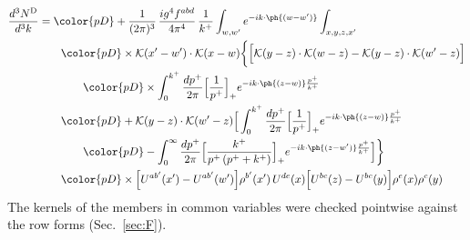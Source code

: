 \begin{align}
\frac{d^{3}N^{\rm D}}{d^{3}k}&={\color{pD}+\frac{1}{(2\pi)^{3}}\,\frac{ig^{4}f^{abd}}{4\pi^{4}}\,\frac{1}{k^{+}}\int_{w,w'}e^{-ik\cdot\ph{(w-w')}}\int_{x,y,z,x'}}\notag\\
&\qquad{\color{pD}\times\mathcal{K}(x'-w')\cdot\mathcal{K}(x-w)\bigg\{\Big[\mathcal{K}(y-z)\cdot\mathcal{K}(w-z)-\mathcal{K}(y-z)\cdot\mathcal{K}(w'-z)\Big]}\notag\\
&\qquad\qquad{\color{pD}\times\int_{0}^{k^{+}}\frac{dp^{+}}{2\pi}\Big[\frac{1}{p^{+}}\Big]_{+}e^{-ik\cdot\ph{(z-w)}\frac{p^{+}}{k^{+}}}}\notag\\
&\qquad{\color{pD}+\mathcal{K}(y-z)\cdot\mathcal{K}(w'-z)\Big[\int_{0}^{k^{+}}\frac{dp^{+}}{2\pi}\Big[\frac{1}{p^{+}}\Big]_{+}e^{-ik\cdot\ph{(z-w)}\frac{p^{+}}{k^{+}}}}\notag\\
&\qquad\qquad{\color{pD}-\int_{0}^{\infty}\frac{dp^{+}}{2\pi}\Big[\frac{k^{+}}{p^{+}\,(p^{+}+k^{+})}\Big]_{+}e^{-ik\cdot\ph{(z-w')}\frac{p^{+}}{k^{+}}}\Big]\bigg\}}\notag\\
&\qquad{\color{pD}\times\Big[U^{ab'}(x')-U^{ab'}(w')\Big]\rho^{b'}(x')\,U^{de}(x)\Big[U^{bc}(z)-U^{bc}(y)\Big]\rho^{e}(x)\rho^{c}(y)}\label{eq:C-D}
\end{align}
The kernels of the members in common variables were checked pointwise against the row forms (Sec.~\ref{sec:F}).


